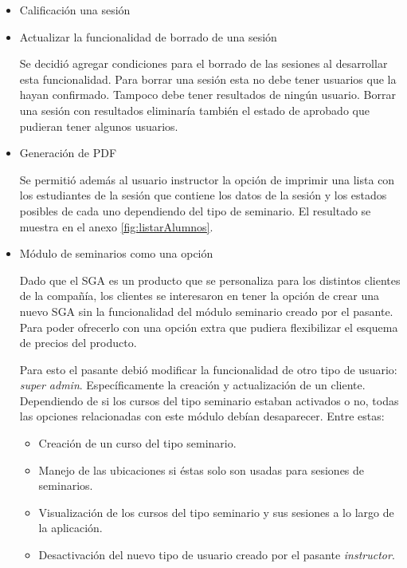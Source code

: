 \begin{itemize}

\item Calificación una sesión


\item Actualizar la funcionalidad de borrado de una sesión

Se decidió agregar condiciones para el borrado de las sesiones al desarrollar esta funcionalidad. Para borrar una sesión esta no debe tener usuarios que la hayan confirmado. Tampoco debe tener resultados de ningún usuario. Borrar una sesión con resultados eliminaría también el estado de aprobado que pudieran tener algunos usuarios.

\item Generación de PDF

Se permitió además al usuario instructor la opción de imprimir una lista con los estudiantes de la sesión que contiene los datos de la sesión y los estados posibles de cada uno dependiendo del tipo de seminario. El resultado se muestra en el anexo \ref{fig:listarAlumnos}.


\item Módulo de seminarios como una opción

Dado que el SGA es un producto que se personaliza para los distintos clientes de la compañía, los clientes se interesaron en tener la opción de crear una nuevo SGA sin la funcionalidad del módulo seminario creado por el pasante. Para poder ofrecerlo con una opción extra que pudiera flexibilizar el esquema de precios del producto.

Para esto el pasante debió modificar la funcionalidad de otro tipo de usuario: \emph{super admin}. Específicamente la creación y actualización de un cliente. Dependiendo de si los cursos del tipo seminario estaban activados o no, todas las opciones relacionadas con este módulo debían desaparecer. Entre estas:

\begin{itemize}
	\item Creación de un curso del tipo seminario.
	\item Manejo de las ubicaciones si éstas solo son usadas para sesiones de seminarios.
	\item Visualización de los cursos del tipo seminario y sus sesiones a lo largo de la aplicación.
	\item Desactivación del nuevo tipo de usuario creado por el pasante \emph{instructor}.
\end{itemize}

\end{itemize}



